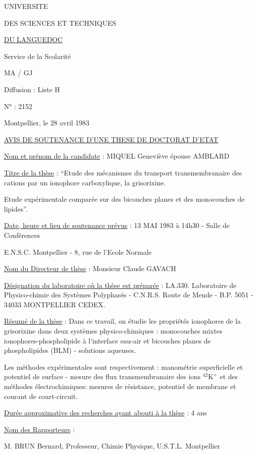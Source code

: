 \begin{center}
UNIVERSITE

DES SCIENCES ET TECHNIQUES

\uline{DU LANGUEDOC}
\end{center}

Service de la Scolarité

MA / GJ

Diffusion : Liste H

N° : 2152

Montpellier, le 28 avril 1983

\uline{AVIS DE SOUTENANCE D'UNE THESE DE DOCTORAT D'ETAT}

\uline{Nom et prénom de la candidate} : MIQUEL Geneviève épouse AMBLARD

\uline{Titre de la thèse} : ``Etude des mécanismes du transport transmembranaire des cations par un ionophore carboxylique, la grisorixine.

Etude expérimentale comparée sur des bicouches planes et des monocouches de lipides''.

\uline{Date, heure et lieu de soutenance prévus} : 13 MAI 1983 à 14h30 - Salle de Conférences

E.N.S.C. Montpellier - 8, rue de l'Ecole Normale

\uline{Nom du Directeur de thèse} : Monsieur Claude GAVACH

\uline{Désignation du laboratoire où la thèse est préparée} : LA.330. Laboratoire de Physico-chimie des Systèmes Polyphasés - C.N.R.S. Route de Mende - B.P. 5051 - 34033 MONTPELLIER CEDEX.

\uline{Résumé de la thèse} : Dans ce travail, on étudie les propriétés ionophores de la grisorixine dans deux systèmes physico-chimiques : monocouches mixtes ionophores-phospholipide à l'interface eau-air et bicouches planes de phospholipides (BLM) - solutions aqueuses.

Les méthodes expérimentales sont respectivement : manométrie superficielle et potentiel de surface - mesure des flux transmembranaire des ions ${}^{42}\mathrm{K}^{+}$ et des méthodes électrochimiques: mesures de résistance, potentiel de membrane et courant de court-circuit.

\uline{Durée approximative des recherches ayant abouti à la thèse} : 4 ans

\uline{Nom des Rapporteurs} :

M. BRUN Bernard, Professeur, Chimie Physique, U.S.T.L. Montpellier

